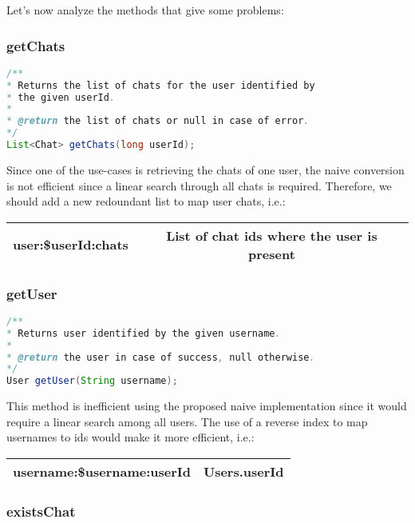 \documentclass[10pt]{article}
\begin{document}
Let's now analyze the methods that give some problems:

\subsubsection{getChats}

\begin{lstlisting}[language = Java]
/**
* Returns the list of chats for the user identified by 
* the given userId.
*
* @return the list of chats or null in case of error.
*/
List<Chat> getChats(long userId);
\end{lstlisting}

Since one of the use-cases is retrieving the chats of one user, the naive
conversion is not efficient since a linear search through all chats is required.
Therefore, we should add a new redoundant list to map user chats, i.e.:

\begin{center}
    \begin{tabular}{ | c | c | }
        \hline
        user:\$userId:chats & List of chat ids where the user is present \\\hline
    \end{tabular}
\end{center}

\subsubsection{getUser}

\begin{lstlisting}[language = Java]
/**
* Returns user identified by the given username.
*
* @return the user in case of success, null otherwise.
*/
User getUser(String username);
\end{lstlisting}

This method is inefficient using the proposed naive implementation since it 
would require a linear search among all users. 
The use of a reverse index to map usernames to ids would make it more efficient, i.e.:

\begin{center}
    \begin{tabular}{ | c | c | }
        \hline
        username:\$username:userId & Users.userId \\\hline
    \end{tabular}
\end{center}

\subsubsection{existsChat}
\end{document}
